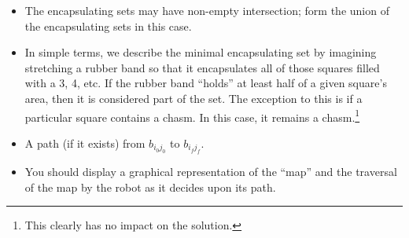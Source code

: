 \documentclass[10pt,notitlepage]{amsart}
\begin{document}
\begin{enumerate}
\begin{itemize}
  \item The encapsulating sets may have non-empty intersection; form the union of the  encapsulating sets in this case.
  \item In simple terms, we describe the minimal encapsulating set by imagining stretching a rubber band so that it encapsulates all of those squares filled with a 3, 4, etc.  If the rubber band ``holds'' at least half of a given square's area, then it is considered part of the set.  The exception to this is if a particular square contains a chasm.  In this case, it remains a chasm.\footnote{This  clearly has no impact on the solution.}
  
\end{itemize}



\end{enumerate}



\begin{itemize}
  \item[] A path (if it exists) from $b_{i_0j_0}$ to $b_{i_fj_f}$.
\end{itemize}


\begin{itemize}
  \item You should display a graphical representation of the ``map'' and the traversal of the map by the robot as it decides upon its path.
\end{itemize}


\vspace{1cm}

\vspace{.2cm}
\end{document}
